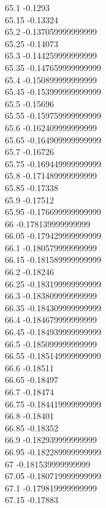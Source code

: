 {65.1	-0.1293\\
65.15	-0.13324\\
65.2	-0.137059999999999\\
65.25	-0.14073\\
65.3	-0.144259999999999\\
65.35	-0.147659999999999\\
65.4	-0.150899999999999\\
65.45	-0.153999999999999\\
65.5	-0.15696\\
65.55	-0.159759999999999\\
65.6	-0.162409999999999\\
65.65	-0.164909999999999\\
65.7	-0.16726\\
65.75	-0.169449999999999\\
65.8	-0.171489999999999\\
65.85	-0.17338\\
65.9	-0.17512\\
65.95	-0.176699999999999\\
66	-0.178139999999999\\
66.05	-0.179429999999999\\
66.1	-0.180579999999999\\
66.15	-0.181589999999999\\
66.2	-0.18246\\
66.25	-0.183199999999999\\
66.3	-0.183809999999999\\
66.35	-0.184309999999999\\
66.4	-0.184679999999999\\
66.45	-0.184939999999999\\
66.5	-0.185099999999999\\
66.55	-0.185149999999999\\
66.6	-0.18511\\
66.65	-0.18497\\
66.7	-0.18474\\
66.75	-0.184419999999999\\
66.8	-0.18401\\
66.85	-0.18352\\
66.9	-0.182939999999999\\
66.95	-0.182289999999999\\
67	-0.181539999999999\\
67.05	-0.180719999999999\\
67.1	-0.179819999999999\\
67.15	-0.17883\\
}
